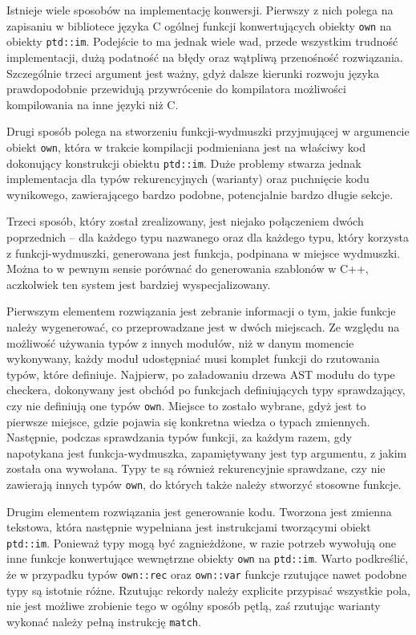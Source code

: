 \documentclass[licencjacka]{pracamgr}
\begin{document}
Istnieje wiele sposobów na implementację konwersji. Pierwszy z nich polega na zapisaniu w bibliotece języka C ogólnej funkcji konwertujących obiekty \texttt{own} na obiekty \texttt{ptd::im}.
Podejście to ma jednak wiele wad, przede wszystkim trudność implementacji, dużą podatność na błędy oraz wątpliwą przenośność rozwiązania.
Szczególnie trzeci argument jest ważny, gdyż dalsze kierunki rozwoju języka prawdopodobnie przewidują przywrócenie do kompilatora możliwości kompilowania na inne języki niż C.

Drugi sposób polega na stworzeniu funkcji-wydmuszki przyjmującej w argumencie obiekt \texttt{own}, która w trakcie kompilacji podmieniana jest na właściwy kod dokonujący konstrukcji obiektu \texttt{ptd::im}.
Duże problemy stwarza jednak implementacja dla typów rekurencyjnych (warianty) oraz puchnięcie kodu wynikowego, zawierającego bardzo podobne, potencjalnie bardzo długie sekcje.

Trzeci sposób, który został zrealizowany, jest niejako połączeniem dwóch poprzednich -- dla każdego typu
nazwanego oraz dla każdego typu, który korzysta z funkcji-wydmuszki, generowana jest funkcja,
podpinana w miejsce wydmuszki. Można to w pewnym sensie porównać do generowania szablonów w C++, aczkolwiek ten system jest bardziej wyspecjalizowany.

Pierwszym elementem rozwiązania jest zebranie informacji o tym, jakie funkcje należy wygenerować,
co przeprowadzane jest w dwóch miejscach.
Ze względu na możliwość używania typów z innych modułów, niż w danym momencie wykonywany, każdy moduł udostępniać musi komplet funkcji do rzutowania typów, które definiuje.
Najpierw, po załadowaniu drzewa AST modułu do type checkera, dokonywany jest obchód po funkcjach definiujących typy sprawdzający, czy nie definiują one typów \texttt{own}.
Miejsce to zostało wybrane, gdyż jest to pierwsze miejsce, gdzie pojawia się konkretna wiedza o typach zmiennych.
Następnie, podczas sprawdzania typów funkcji, za każdym razem, gdy napotykana jest funkcja-wydmuszka, zapamiętywany jest typ argumentu, z jakim została ona wywołana.
Typy te są również rekurencyjnie sprawdzane, czy nie zawierają innych typów \texttt{own}, do których także należy stworzyć stosowne funkcje.

Drugim elementem rozwiązania jest generowanie kodu. Tworzona jest zmienna tekstowa, która następnie wypełniana jest instrukcjami tworzącymi obiekt \texttt{ptd::im}.
Ponieważ typy mogą być zagnieżdżone, w razie potrzeb wywołują one inne funkcje konwertujące wewnętrzne obiekty \texttt{own} na \texttt{ptd::im}.
Warto podkreślić, że w przypadku typów \texttt{own::rec} oraz \texttt{own::var} funkcje rzutujące nawet podobne typy są istotnie różne.
Rzutując rekordy należy explicite przypisać wszystkie pola, nie jest możliwe zrobienie tego w ogólny sposób pętlą, zaś rzutując warianty
wykonać należy pełną instrukcję \texttt{match}.
\end{document}
